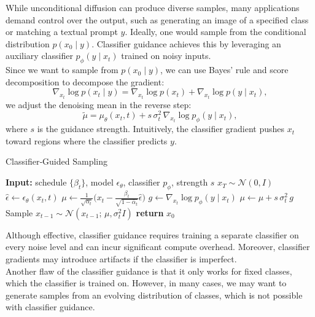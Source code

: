 \documentclass[11pt,a4paper]{article}
\begin{document}
While unconditional diffusion can produce diverse samples, many applications demand control over the output, such as generating an image of a specified class or matching a textual prompt $y$.  Ideally, one would sample from the conditional distribution $p(x_0\mid y)$.  Classifier guidance \cite{dhariwal2021diffusion} achieves this by leveraging an auxiliary classifier $p_\phi(y\!\mid\!x_t)$ trained on noisy inputs.\\


Since we want to sample from $p(x_0\mid y)$, we can use Bayes' rule and score decomposition to decompose the gradient:
\[
\nabla_{x_t}\log p(x_t\mid y)
=\nabla_{x_t}\log p(x_t)
+\nabla_{x_t}\log p(y\mid x_t),
\]
we adjust the denoising mean in the reverse step:
\begin{equation}\label{eq:clf_guidance}
\tilde{\mu}
=\mu_\theta(x_t,t)
+ s\,\sigma_t^2\,\nabla_{x_t}\log p_\phi(y\mid x_t),
\end{equation}
where $s$ is the guidance strength.  Intuitively, the classifier gradient pushes $x_t$ toward regions where the classifier predicts $y$.

\begin{algorithm}[htb]
\caption{Classifier‐Guided Sampling}\label{alg:clf_guidance}
\begin{algorithmic}[1]
  \STATE \textbf{Input:} schedule $\{\beta_t\}$, model $\epsilon_\theta$, classifier $p_\phi$, strength $s$
  \STATE $x_T \sim \mathcal{N}(0,I)$
    \STATE $\hat\epsilon \leftarrow \epsilon_\theta(x_t,t)$
    \STATE $\mu \leftarrow \frac{1}{\sqrt{\alpha_t}}\bigl(x_t - \tfrac{\beta_t}{\sqrt{1-\bar\alpha_t}}\hat\epsilon\bigr)$
    \STATE $g \leftarrow \nabla_{x_t}\log p_\phi(y\!\mid\!x_t)$
    \STATE $\mu \leftarrow \mu + s\,\sigma_t^2\,g$
    \STATE Sample $x_{t-1}\sim\mathcal{N}(x_{t-1};\,\mu,\sigma_t^2 I)$
  \ENDFOR
  \STATE \textbf{return} $x_0$
\end{algorithmic}
\end{algorithm}

Although effective, classifier guidance requires training a separate classifier on every noise level and can incur significant compute overhead.  Moreover, classifier gradients may introduce artifacts if the classifier is imperfect.\\

Another flaw of the classifier guidance is that it only works for fixed classes, which the classifier is trained on. However, in many cases, we may want to generate samples from an evolving distribution of classes, which is not possible with classifier guidance.
\end{document}

